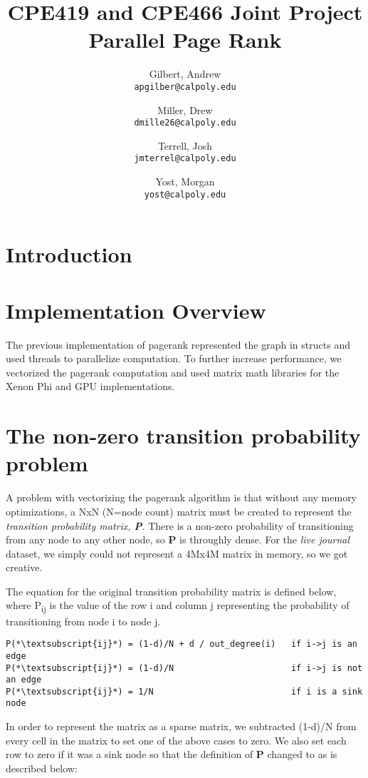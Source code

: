 \documentclass[draft]{report}
\title{CPE419 and CPE466 Joint Project\\Parallel Page Rank}
\author{
  Gilbert, Andrew\\
  \texttt{apgilber@calpoly.edu}
  \and
  Miller, Drew\\
  \texttt{dmille26@calpoly.edu}
  \and
  Terrell, Josh\\
  \texttt{jmterrel@calpoly.edu}
  \and
  Yost, Morgan\\
  \texttt{yost@calpoly.edu}
}
\date{}
\begin{document}
\maketitle

\begin{abstract}
\end{abstract}

\section{Introduction}

\section{Implementation Overview}
The previous implementation of pagerank represented the graph in structs and used threads to parallelize computation. To further increase performance, we vectorized the pagerank computation and used matrix math libraries for the Xenon Phi and GPU implementations.

\section{The non-zero transition probability problem}
A problem with vectorizing the pagerank algorithm is that without any memory optimizations, a NxN (N=node count) matrix must be created to represent the \textit{transition probability matrix, \textbf{P}}. There is a non-zero probability of transitioning from any node to any other node, so \textbf{P} is throughly dense. For the \textit{live journal} dataset, we simply could not represent a 4Mx4M matrix in memory, so we got creative.

The equation for the original transition probability matrix is defined below, where P\textsubscript{ij} is the value of the row i and column j representing the probability of transitioning from node i to node j.

\begin{lstlisting}
P(*\textsubscript{ij}*) = (1-d)/N + d / out_degree(i)   if i->j is an edge
P(*\textsubscript{ij}*) = (1-d)/N                       if i->j is not an edge
P(*\textsubscript{ij}*) = 1/N                           if i is a sink node
\end{lstlisting}

In order to represent the matrix as a sparse matrix, we subtracted (1-d)/N from every cell in the matrix to set one of the above cases to zero. We also set each row to zero if it was a sink node so that the definition of \textbf{P} changed to as is described below:
\end{document}
